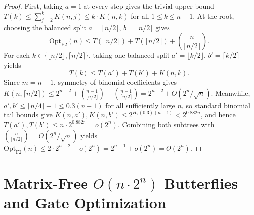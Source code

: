 \documentclass[11pt,a4paper]{article}
\begin{document}
\begin{proof}
First, taking $a = 1$ at every step gives the trivial upper bound $T(k) \le \sum_{j=2}^{k} K(n,j) \le k \cdot K(n,k)$ for all $1 \le k \le n - 1$. At the root, choosing the balanced split $a = \lfloor n/2 \rfloor$, $b = \lceil n/2 \rceil$ gives
\begin{equation}
\mathrm{Opt}_{\mathrm{F2}}(n) \le T(\lfloor n/2 \rfloor) + T(\lceil n/2 \rceil) + \binom{n}{\lfloor n/2 \rfloor}.
\end{equation}
For each $k \in \{\lfloor n/2 \rfloor, \lceil n/2 \rceil\}$, taking one balanced split $a' = \lfloor k/2 \rfloor$, $b' = \lceil k/2 \rceil$ yields
\begin{equation}
T(k) \le T(a') + T(b') + K(n,k).
\end{equation}
Since $m = n - 1$, symmetry of binomial coefficients gives $K(n, \lceil n/2 \rceil) \le 2^{n-2} + \binom{n-1}{\lfloor n/2 \rfloor} + \binom{n-1}{\lceil n/2 \rceil} = 2^{n-2} + O(2^n / \sqrt{n})$. Meanwhile, $a', b' \le \lceil n/4 \rceil + 1 \le 0.3(n - 1)$ for all sufficiently large $n$, so standard binomial tail bounds give $K(n, a'), K(n, b') \le 2^{H_2(0.3)(n-1)} < 2^{0.882 n}$, and hence $T(a'), T(b') \le n \cdot 2^{0.882 n} = o(2^n)$. Combining both subtrees with $\binom{n}{\lfloor n/2 \rfloor} = O(2^n / \sqrt{n})$ yields $\mathrm{Opt}_{\mathrm{F2}}(n) \le 2 \cdot 2^{n-2} + o(2^n) = 2^{n-1} + o(2^n) = O(2^n)$.
\end{proof}

\section{Matrix-Free $O(n \cdot 2^n)$ Butterflies and Gate Optimization}
\end{document}
